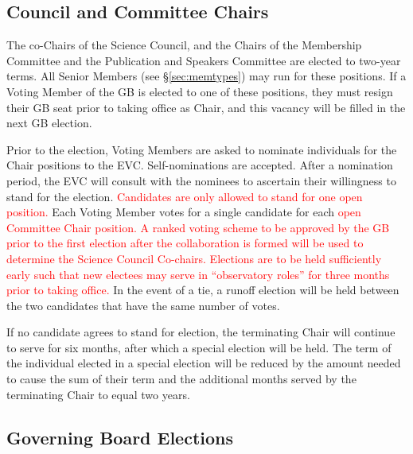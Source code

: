\documentclass[12pt]{article}
\begin{document}

\subsection{Council and Committee Chairs}
The co-Chairs of the Science Council, and the Chairs of the Membership Committee and the Publication and Speakers Committee are elected to two-year terms. All Senior Members (see \S\ref{sec:memtypes}) may  run for these positions.  If a Voting Member of the GB is elected to one of these positions, they must resign their GB seat prior to taking office as Chair, and this vacancy will be filled in the next GB election. 

Prior to the election, Voting Members are asked to nominate individuals for the Chair positions to the EVC.   Self-nominations are accepted.
After a nomination period, the EVC will consult with the nominees to ascertain their willingness to stand for the election. \textcolor{red}{Candidates are only allowed to stand for one open position.}
Each Voting Member votes for a single candidate for each  \textcolor{red}{open Committee  Chair position. A ranked voting scheme to be approved by the GB prior to the first election after the collaboration is formed will be used to determine the Science Council Co-chairs. Elections are to be held sufficiently early such that new electees may serve in ``observatory roles'' for three months prior to taking office.}
In the event of a tie, a runoff election will be held between the two candidates that have the same number of votes. 

If no candidate agrees to stand for election, the terminating Chair will continue to serve for six months, after which a special election will be held. The term of the individual elected in a special election will be reduced by the amount needed to cause the sum of their term and the additional months served by the terminating Chair to equal two years.


\subsection{Governing Board Elections }
\label{sec:gb-elections}
\end{document}
